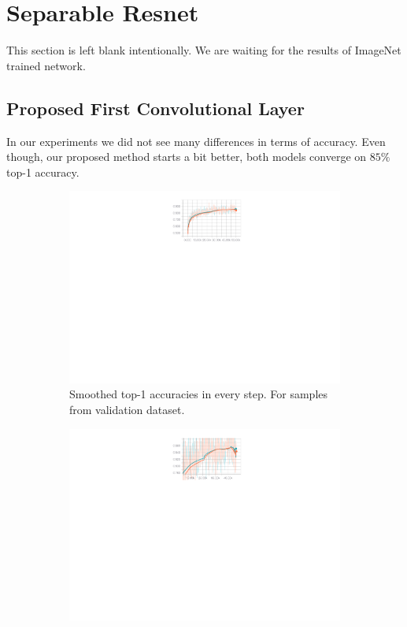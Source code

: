 \section{Separable Resnet}
This section is left blank intentionally. We are waiting for the results of ImageNet trained network.
\iffalse
\subsection{Proposed First Convolutional Layer}
In our experiments we did not see many differences in terms of accuracy. Even though, our proposed method starts a bit better, both models converge on $85\%$ top-1 accuracy. 
\begin{figure}[!h]
  \vspace{-45px}
  \centering
  \begin{subfigure}{.79\textwidth}
        \includegraphics[width=1\linewidth]{images/proposed_conv_comparison_evaluation.pdf}
        \caption{Smoothed top-1 accuracies in every step. For samples from validation dataset.}
        \label{fig:conv-comparison-proposed-full}
  \end{subfigure}
  \begin{subfigure}{.79\textwidth}
        \includegraphics[width=1\linewidth]{images/proposed_conv_comparison_evaluation_zoomed.pdf}

\end{subfigure}
\end{figure}
